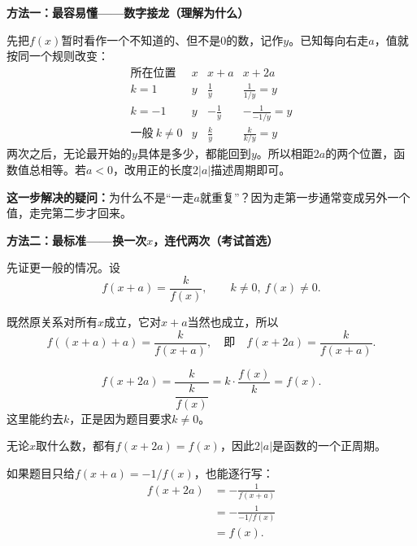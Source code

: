 \clearpage
\begin{proofbox}
\textbf{\textcolor{CProof}{方法一：最容易懂——数字接龙（理解为什么）}}



先把$f(x)$暂时看作一个不知道的、但不是$0$的数，记作$y$。已知每向右走$a$，值就按同一个规则改变：
\[
\begin{array}{c|ccc}
 \text{所在位置}&x&x+a&x+2a\\ \hline
 k=1&y&\frac1y&\frac1{1/y}=y\\[0.4em]
 k=-1&y&-\frac1y&-\frac1{-1/y}=y\\[0.4em]
 \text{一般}\ k\ne0&y&\frac{k}{y}&\frac{k}{k/y}=y
\end{array}
\]
两次之后，无论最开始的$y$具体是多少，都能回到$y$。所以相距$2a$的两个位置，函数值总相等。若$a<0$，改用正的长度$2|a|$描述周期即可。

\textbf{这一步解决的疑问：}为什么不是“一走$a$就重复”？因为走第一步通常变成另外一个值，走完第二步才回来。

\medskip

\end{proofbox}
\clearpage
\begin{proofbox}
\textbf{\textcolor{CProof}{方法二：最标准——换一次$x$，连代两次（考试首选）}}



先证更一般的情况。设
\[
 f(x+a)=\frac{k}{f(x)},\qquad k\ne0,\ f(x)\ne0.
\]
\begin{description}[style=nextline,leftmargin=2.8em,labelsep=0.5em,itemsep=0.55em]
\item[\textbf{第1步：把$x$换成$x+a$。}] 既然原关系对所有$x$成立，它对$x+a$当然也成立，所以
\[
 f((x+a)+a)=\frac{k}{f(x+a)},\quad
 \text{即}\quad f(x+2a)=\frac{k}{f(x+a)}.
\]
\item[\textbf{第2步：把已知的$f(x+a)$填回去。}]
\[
 f(x+2a)=\frac{k}{\dfrac{k}{f(x)}}
 =k\cdot\frac{f(x)}{k}=f(x).
\]
这里能约去$k$，正是因为题目要求$k\ne0$。
\item[\textbf{第3步：把等式翻译成周期。}]
无论$x$取什么数，都有$f(x+2a)=f(x)$，因此$2|a|$是函数的一个正周期。
\end{description}

如果题目只给\(f(x+a)=-1/f(x)\)，也能逐行写：
\[
\begin{aligned}
 f(x+2a)&=-\frac1{f(x+a)}\\
 &=-\frac1{-1/f(x)}\\
 &=f(x).
\end{aligned}
\]

\medskip

\end{proofbox}
